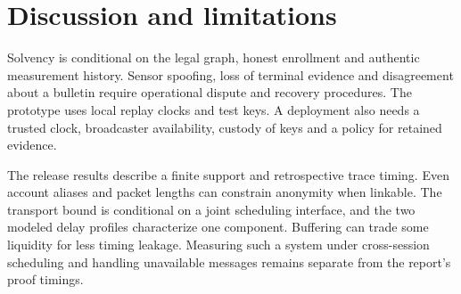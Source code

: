 \section{Discussion and limitations}
\label{sec:discussion}

Solvency is conditional on the legal graph, honest enrollment and authentic measurement history. Sensor spoofing, loss of terminal evidence and disagreement about a bulletin require operational dispute and recovery procedures. The prototype uses local replay clocks and test keys. A deployment also needs a trusted clock, broadcaster availability, custody of keys and a policy for retained evidence.

The release results describe a finite support and retrospective trace timing. Even account aliases and packet lengths can constrain anonymity when linkable. The transport bound is conditional on a joint scheduling interface, and the two modeled delay profiles characterize one component. Buffering can trade some liquidity for less timing leakage. Measuring such a system under cross-session scheduling and handling unavailable messages remains separate from the report's proof timings.
